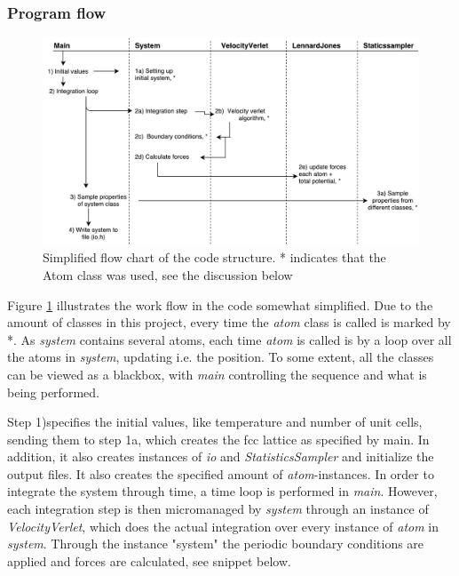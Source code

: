 \subsubsection{Program flow}

\begin{figure}[H]
	\centering
	\includegraphics[width=1\linewidth]{../figures/klasser_proj5}
	\caption{Simplified flow chart of the code structure. * indicates that the Atom class was used, see the discussion below}
	\label{fig:klasserproj5}
\end{figure}

Figure \ref{fig:klasserproj5} illustrates the work flow in the code somewhat simplified. Due to the amount of classes in this project, every time the \textit{atom} class is called is marked by *. As  \textit{system} contains several atoms, each time \textit{atom} is called is by a loop over all the atoms in \textit{system}, updating i.e. the position. To some extent, all the classes can be viewed as a blackbox, with \textit{main} controlling the sequence and what is being performed. 

Step 1)specifies the initial values, like temperature and number of unit cells, sending them to step 1a, which creates the fcc lattice as specified by main. In addition, it also creates instances of \textit{io} and \textit{StatisticsSampler} and initialize  the output files.  It also creates the specified amount of \textit{atom}-instances. In order to integrate the system through time, a time loop is performed in \textit{main}. However, each integration step is then micromanaged by \textit{system} through an instance of \textit{VelocityVerlet}, which does the actual integration over every instance of \textit{atom} in \textit{system}. Through the instance "system" the periodic boundary conditions are applied and forces are calculated, see snippet below. 

